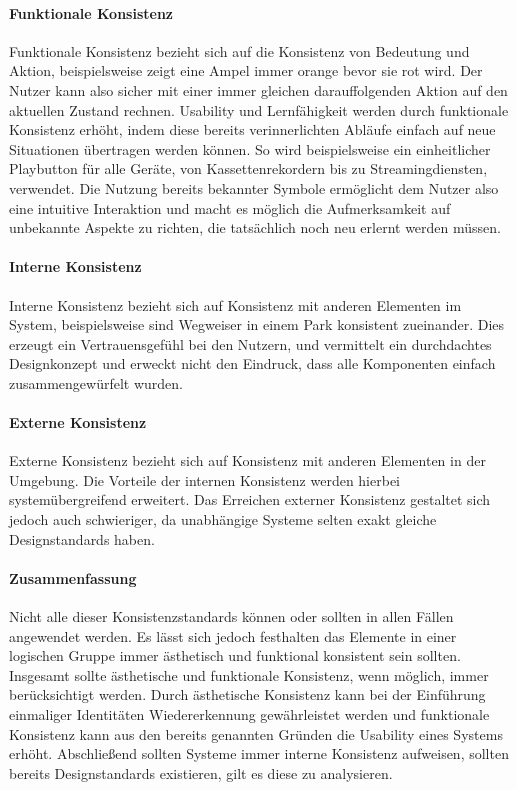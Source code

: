 \paragraph{Funktionale Konsistenz}
Funktionale Konsistenz bezieht sich auf die Konsistenz von Bedeutung und Aktion, beispielsweise zeigt eine Ampel immer orange bevor sie rot wird. Der Nutzer kann also sicher mit einer immer gleichen darauffolgenden Aktion auf den aktuellen Zustand rechnen. 
Usability und Lernfähigkeit werden durch funktionale Konsistenz erhöht, indem diese bereits verinnerlichten Abläufe einfach auf neue Situationen übertragen werden können. So wird beispielsweise ein einheitlicher Playbutton für alle Geräte, von Kassettenrekordern bis zu Streamingdiensten, verwendet.
Die Nutzung bereits bekannter Symbole ermöglicht dem Nutzer also eine intuitive Interaktion und macht es möglich die Aufmerksamkeit auf unbekannte Aspekte zu richten, die tatsächlich noch neu erlernt werden müssen.

\paragraph{Interne Konsistenz}
Interne Konsistenz bezieht sich auf Konsistenz mit anderen Elementen im System, beispielsweise sind Wegweiser in einem Park konsistent zueinander.
Dies erzeugt ein Vertrauensgefühl bei den Nutzern, und vermittelt ein durchdachtes Designkonzept und erweckt nicht den Eindruck, dass alle Komponenten einfach zusammengewürfelt wurden.

\paragraph{Externe Konsistenz}
Externe Konsistenz bezieht sich auf Konsistenz mit anderen Elementen in der Umgebung. Die Vorteile der internen Konsistenz werden hierbei systemübergreifend erweitert. Das Erreichen externer Konsistenz gestaltet sich jedoch auch schwieriger, da unabhängige Systeme selten exakt gleiche Designstandards haben.

\paragraph{Zusammenfassung} Nicht alle dieser Konsistenzstandards können oder sollten in allen Fällen angewendet werden. 
Es lässt sich jedoch festhalten das Elemente in einer logischen Gruppe immer ästhetisch und funktional konsistent sein sollten.
Insgesamt sollte ästhetische und funktionale Konsistenz, wenn möglich, immer berücksichtigt werden.
Durch ästhetische Konsistenz kann bei der Einführung einmaliger Identitäten Wiedererkennung gewährleistet werden und funktionale Konsistenz kann aus den bereits genannten Gründen die Usability eines Systems erhöht.
Abschließend sollten Systeme immer interne Konsistenz aufweisen, sollten bereits Designstandards existieren, gilt es diese zu analysieren.\cite{Lidwell.2010}

